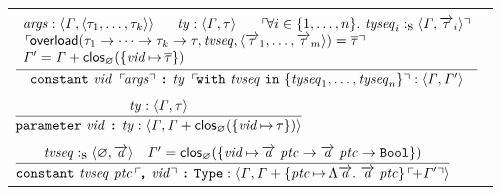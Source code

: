 \documentclass[final]{article}
\begin{document}
\begin{figure}[t]
\begin{small}
\begin{center}
\begin{tabular}{llll}
    \\
    &&&
    \\

    \multicolumn{4}{l}{
      $\MEMinferffp
      {\MEMtyping
        {\CONSconsOpargsOpovOpcsDec
          {\METAvid}
          {\METAargs}
          {\METAty}
          {\METAtypvarseq}
          {\CONStypseqsetn{\METAtypseq_1}{\METAtypseq_n}}
          {\METAexp}
        }
        {\METAityenv}
        {\METAityenv'}
      }
      {\MEMtyping{\METAargs}{\METAityenv}{\mytuple{\METAity_1,\dots,\METAity_k}}}
      {\MEMtyping{\METAty}{\METAityenv}{\METAity}}
      {\CONSop{\forallexp{i\in\{1,\dots,n\}}{\MEMtypingseq{\METAtypseq_i}{\METAityenv}{\METAityseq_i}}}}
      {\CONSop{\MEMoverload{\CONSarrowty{\METAity_1}{\CONSarrowty{\cdots}{\CONSarrowty{\METAity_k}{\METAity}}}}{\METAtypvarseq}{\mytuple{\METAityseq_1,\dots,\METAityseq_m}}=\METAityset}}
      {\METAityenv'=\MEMplusenv{\METAityenv}\MEMclos{\CONSemptyityenv}{\{\asgn{\METAvid}{\METAityset}\}}}$
    }

    \\
    &&&
    \\

    \multicolumn{4}{l}{
      $\MEMinferb
      {\MEMtyping
        {\CONSparameter{\METAvid}{\METAty}}
        {\METAityenv}
        {\MEMplusenv{\METAityenv}\MEMclos{\CONSemptyityenv}{\{\asgn{\METAvid}{\METAity}\}}}
      }
      {\MEMtyping{\METAty}{\METAityenv}{\METAity}}$
    }

    \\
    &&&
    \\

    \multicolumn{4}{l}{
      $\MEMinferc
      {\MEMtyping
        {\CONSconstydecOpeq{\METAtypvarseq}{\METAtycon}{\METAvid}}
        {\METAityenv}
        {\MEMplusopenv
            {\MEMplusenv
              {\METAityenv}
              {\{\asgn
                {\METAtycon}
                {\CONSityfun
                  {\METAtyvarseq}
                  {\CONSconsty{\METAtyvarseq}{\METAtycon}}
                }\}
              }
            }
            {\METAityenv'}
        }
      }
      {\MEMtypingseq{\METAtypvarseq}{\CONSemptyityenv}{\METAtyvarseq}}
      {
        \METAityenv'
        =
        \MEMclos
            {\CONSemptyityenv}
            {\{\asgn
              {\METAvid}
              {\CONSarrowty
                {\CONSconsty{\METAtyvarseq}{\METAtycon}}
                {\CONSarrowty
                  {\CONSconsty{\METAtyvarseq}{\METAtycon}}
                  {\CONSboolty}
                }
              }\}
            }
      }$
    }


\end{tabular}
\end{center}
\end{small}
\end{figure}
\end{document}

